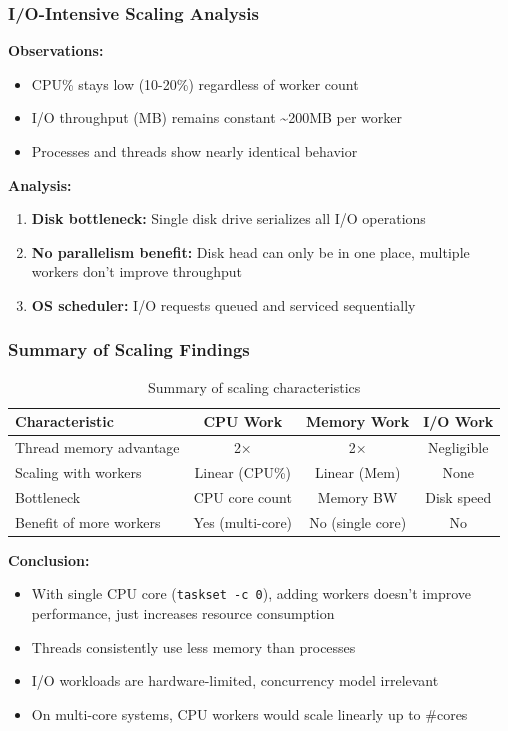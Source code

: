 \documentclass[12pt,a4paper]{article}
\begin{document}
\subsubsection{I/O-Intensive Scaling Analysis}

\textbf{Observations:}
\begin{itemize}
    \item CPU\% stays low (10-20\%) regardless of worker count
    \item I/O throughput (MB) remains constant \textasciitilde200MB per worker
    \item Processes and threads show nearly identical behavior
\end{itemize}

\textbf{Analysis:}
\begin{enumerate}
    \item \textbf{Disk bottleneck:} Single disk drive serializes all I/O operations
    \item \textbf{No parallelism benefit:} Disk head can only be in one place,
    multiple workers don't improve throughput
    \item \textbf{OS scheduler:} I/O requests queued and serviced sequentially
\end{enumerate}

\subsubsection{Summary of Scaling Findings}

\begin{table}[H]
\centering
\begin{tabular}{lccc}
\toprule
\textbf{Characteristic} & \textbf{CPU Work} & \textbf{Memory Work} & \textbf{I/O Work} \\
\midrule
Thread memory advantage & 2× & 2× & Negligible \\
Scaling with workers & Linear (CPU\%) & Linear (Mem) & None \\
Bottleneck & CPU core count & Memory BW & Disk speed \\
Benefit of more workers & Yes (multi-core) & No (single core) & No \\
\bottomrule
\end{tabular}
\caption{Summary of scaling characteristics}
\label{tab:scaling_summary}
\end{table}

\textbf{Conclusion:}
\begin{itemize}
    \item With single CPU core (\texttt{taskset -c 0}), adding workers doesn't improve
    performance, just increases resource consumption
    \item Threads consistently use less memory than processes
    \item I/O workloads are hardware-limited, concurrency model irrelevant
    \item On multi-core systems, CPU workers would scale linearly up to \#cores
\end{itemize}
\end{document}
